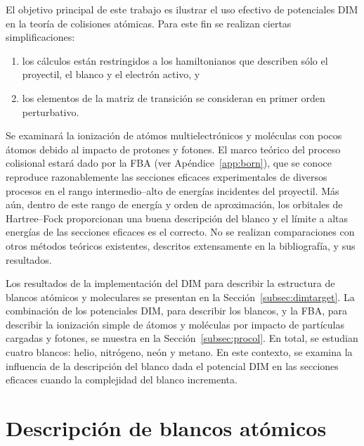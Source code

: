 El objetivo principal de este trabajo es ilustrar el uso efectivo de 
potenciales DIM en la teoría de colisiones atómicas. Para este fin 
se realizan ciertas simplificaciones: 
\begin{enumerate}
\item los cálculos están restringidos a los hamiltonianos que describen
sólo el proyectil, el blanco y el electrón activo, y
\item los elementos de la matriz de transición se consideran en primer 
orden perturbativo.
\end{enumerate}
Se examinará la ionización de atómos multielectrónicos y moléculas con 
pocos átomos debido al impacto de protones y fotones. El marco teórico 
del proceso colisional estará dado por la FBA (ver 
Apéndice~\ref{app:born}), que se conoce reproduce razonablemente las 
secciones eficaces experimentales de diversos procesos en el rango 
intermedio--alto de energías incidentes del proyectil. Más aún, dentro 
de este rango de energía y orden de aproximación, los orbitales de 
Hartree--Fock proporcionan una buena descripción del blanco y el límite 
a altas energías de las secciones eficaces es el correcto. No se 
realizan comparaciones con otros métodos teóricos existentes, 
descritos extensamente en la bibliografía, y sus resultados. 

Los resultados de la implementación del DIM para describir la estructura 
de blancos atómicos y moleculares se presentan en la 
Sección~\ref{subsec:dimtarget}. La combinación de los potenciales DIM, 
para describir los blancos, y la FBA, para describir la ionización 
simple de átomos y moléculas por impacto de partículas cargadas y 
fotones, se muestra en la Sección~\ref{subsec:procol}. En total, se 
estudian cuatro blancos: helio, nitrógeno, neón y metano. En este 
contexto, se examina la influencia de la descripción del blanco dada 
el potencial DIM en las secciones eficaces cuando la complejidad del 
blanco incrementa.

\section{Descripción de blancos atómicos}
\label{sec:atomos}

